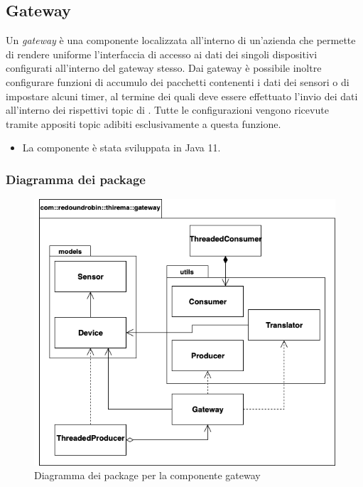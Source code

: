 \subsection{Gateway}
	Un \textit{gateway} è una componente localizzata all'interno di un'azienda che permette di rendere uniforme l'interfaccia di accesso ai dati dei singoli dispositivi configurati all'interno del gateway stesso.
	\newline
	Dai gateway è possibile inoltre configurare funzioni di accumulo dei pacchetti contenenti i dati dei sensori o di impostare alcuni timer, al termine dei quali deve essere effettuato l'invio dei dati all'interno dei rispettivi topic di .
	\newline
	Tutte le configurazioni vengono ricevute tramite appositi topic adibiti esclusivamente a questa funzione.
	\begin{itemize}
		\item La componente è stata sviluppata in Java 11.
	\end{itemize}
	
	\subsubsection{Diagramma dei package}%
	  	\begin{figure}[H]
			\centering
			\includegraphics[scale=0.550]{res/images/GATEWAY/GatewayPackage.png}
			\caption{Diagramma dei package per la componente gateway}
			\label{Diagramma 1}
		\end{figure}
